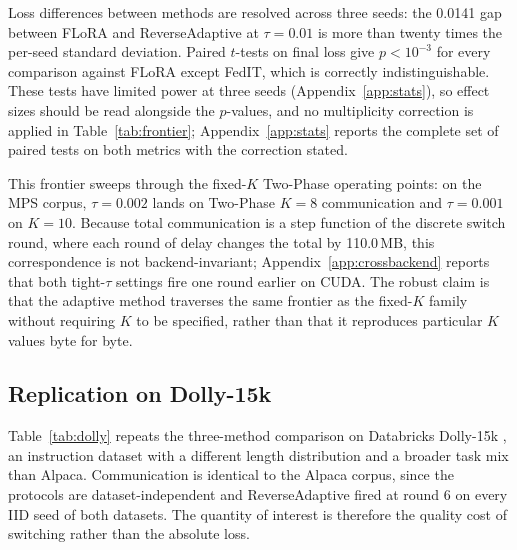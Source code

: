 \documentclass[iicol,pdflatex,sn-mathphys-num]{sn-jnl}
\begin{document}
Loss differences between methods are resolved across three seeds: the 0.0141 gap between FLoRA and ReverseAdaptive at $\tau{=}0.01$ is more than twenty times the per-seed standard deviation. Paired $t$-tests on final loss give $p < 10^{-3}$ for every comparison against FLoRA except FedIT, which is correctly indistinguishable. These tests have limited power at three seeds (Appendix~\ref{app:stats}), so effect sizes should be read alongside the $p$-values, and no multiplicity correction is applied in Table~\ref{tab:frontier}; Appendix~\ref{app:stats} reports the complete set of paired tests on both metrics with the correction stated.



This frontier sweeps through the fixed-$K$ Two-Phase operating points: on the MPS corpus, $\tau{=}0.002$ lands on Two-Phase $K{=}8$ communication and $\tau{=}0.001$ on $K{=}10$. Because total communication is a step function of the discrete switch round, where each round of delay changes the total by 110.0\,MB, this correspondence is not backend-invariant; Appendix~\ref{app:crossbackend} reports that both tight-$\tau$ settings fire one round earlier on CUDA. The robust claim is that the adaptive method traverses the same frontier as the fixed-$K$ family without requiring $K$ to be specified, rather than that it reproduces particular $K$ values byte for byte.

\subsection{Replication on Dolly-15k}
\label{sec:dolly}
Table~\ref{tab:dolly} repeats the three-method comparison on Databricks Dolly-15k \cite{dolly2023}, an instruction dataset with a different length distribution and a broader task mix than Alpaca. Communication is identical to the Alpaca corpus, since the protocols are dataset-independent and ReverseAdaptive fired at round 6 on every IID seed of both datasets. The quantity of interest is therefore the quality cost of switching rather than the absolute loss.
\end{document}
